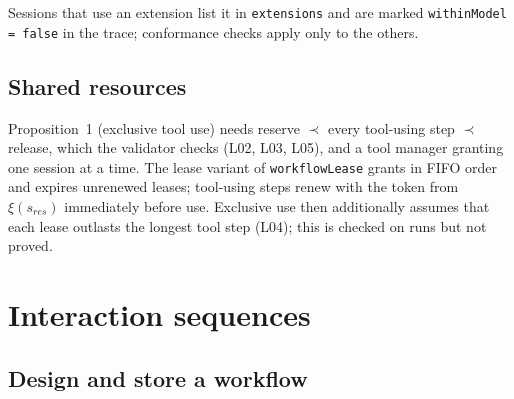 \documentclass[a4paper]{arrowhead}
\begin{document}
Sessions that use an extension list it in \texttt{extensions} and are marked \texttt{withinModel = false} in the trace;
conformance checks apply only to the others.

\subsection{Shared resources}
Proposition~1 (exclusive tool use) needs reserve $\prec$ every tool-using step $\prec$ release, which the validator checks
(L02, L03, L05), and a tool manager granting one session at a time. The lease variant of \texttt{workflowLease} grants in
FIFO order and expires unrenewed leases; tool-using steps renew with the token from $\xi(s_{res})$ immediately before
use. Exclusive use then additionally assumes that each lease outlasts the longest tool step (L04); this is checked on runs
but not proved.

\newpage
\section{Interaction sequences}
\label{sec:sequences}
\subsection{Design and store a workflow}
\end{document}
